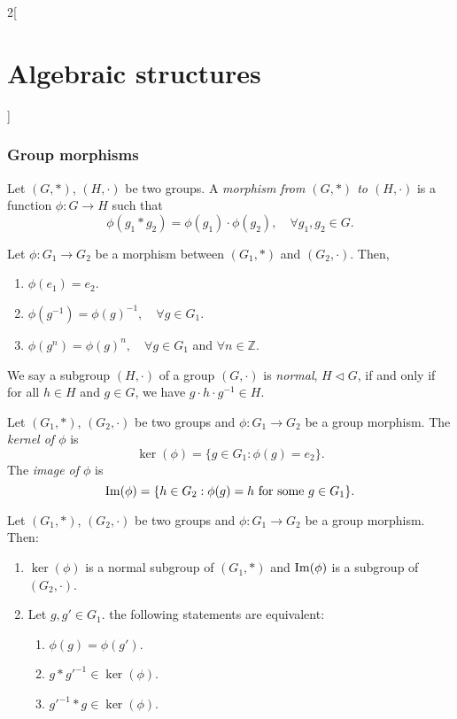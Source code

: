 \documentclass[class=article,10pt,crop=false]{standalone}
\begin{document}
\begin{multicols}{2}[\section{Algebraic structures}]
\subsubsection*{Group morphisms}
\begin{definition}
Let $(G,*)$, $(H,\cdot)$ be two groups. A \textit{morphism from $(G,*)$ to $(H,\cdot)$} is a function $\phi:G\rightarrow H$ such that $$\phi(g_1*g_2)=\phi(g_1)\cdot\phi(g_2),\quad\forall g_1,g_2\in G.$$
\end{definition}
\begin{lemma}
Let $\phi:G_1\rightarrow G_2$ be a morphism between $(G_1,*)$ and $(G_2,\cdot)$. Then,
\begin{enumerate}
    \item $\phi(e_1)=e_2$.
    \item $\phi(g^{-1})=\phi(g)^{-1},\quad\forall g\in G_1$.
    \item $\phi(g^n)=\phi(g)^n,\quad\forall g\in G_1$ and $\forall n\in\mathbb{Z}$.
\end{enumerate}
\end{lemma}
\begin{definition}
We say a subgroup $(H,\cdot)$ of a group $(G,\cdot)$ is \textit{normal}, $H\lhd G$, if and only if for all $h\in H$ and $g\in G$, we have $g\cdot h\cdot g^{-1}\in H$.
\end{definition}
\begin{definition}
Let $(G_1,*)$, $(G_2,\cdot)$ be two groups and $\phi:G_1\rightarrow G_2$ be a group morphism. The \textit{kernel of $\phi$} is $$\ker(\phi)=\{g\in G_1:\phi(g)=e_2\}.$$ The \textit{image of $\phi$} is $$\operatorname{Im}(\phi)=\{h\in G_2:\phi(g)=h\text{ for some }g\in G_1\}.$$
\end{definition}
\begin{prop}
Let $(G_1,*)$, $(G_2,\cdot)$ be two groups and $\phi:G_1\rightarrow G_2$ be a group morphism. Then:
\begin{enumerate}
    \item $\ker(\phi)$ is a normal subgroup of $(G_1,*)$ and $\operatorname{Im}(\phi)$ is a subgroup of $(G_2,\cdot)$.
    \item Let $g,g'\in G_1$. the following statements are equivalent:
    \begin{enumerate}
        \item $\phi(g)=\phi(g')$.
        \item $g*g'^{-1}\in\ker(\phi)$.
        \item $g'^{-1}*g\in\ker(\phi)$.
    \end{enumerate}

\end{enumerate}
\end{prop}
\end{multicols}
\end{document}
